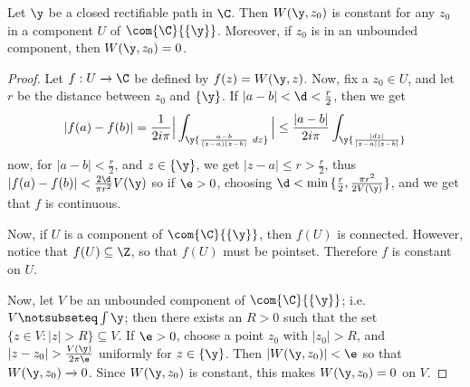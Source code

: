 \begin{theorem}\label{4.5.3}
    Let $\y$ be a closed rectifiable path in  $\C$. Then  $W(\y,z_0)$ is
    constant for any $z_0$ in a component $U$ of  $\com{\C}{\{\y\}}$. Moreover,
    if $z_0$ is in an unbounded component, then  $W(\y,z_0)=0$.
\end{theorem}
\begin{proof}
    Let $f:U \xrightarrow{} \C$ be defined by $f(z)=W(\y,z)$. Now, fix a $z_0
    \in U$, and let $r$ be the distance between  $z_0$ and $\{\y\}$. If
    $|a-b|<\d<\frac{r}{2}$, then we  get
    \begin{equation*}
        |f(a)-f(b)|=
        \frac{1}{2i\pi}\Big{|} \int_\y{\frac{a-b}{(z-a)(z-b)} \ dz} \Big{|} \leq
        \frac{|a-b|}{2i\pi}\int_\y{\frac{|dz|}{|z-a||z-b|}}
    \end{equation*}
    now, for $|a-b|<\frac{r}{2}$, and $z \in \{\y\}$, we get $|z-a| \leq
    r>\frac{r}{2}$, thus $|f(a)-f(b)|<\frac{2\d}{\pi{r^2}}V(\y)$ so if $\e>0$,
    choosing  $\d<\min{\{\frac{r}{2}, \frac{\pi{r^2}}{2V(\y)}\}}$, and we get
    that $f$ is continuous.

    Now, if $U$ is a component of $\com{\C}{\{\y\}}$, then $f(U)$ is connected.
    However, notice that $f(U) \subseteq \Z$, so that $f(U)$ must be pointset.
    Therefore $f$ is constant on $U$.

    Now, let $V$ be an unbounded component of $\com{\C}{\{\y\}}$; i.e. $V
    \notsubseteq \int{\y}$; then there exists an $R>0$ such that the set  $\{z
    \in V : |z|>R\} \subseteq V$. If $\e>0$, choose a point  $z_0$ with
    $|z_0|>R$, and $|z-z_0|>\frac{V(\y)}{2\pi\e}$ uniformly for $z \in
    \{\y\}$. Then $|W(\y,z_0)|<\e$ so that $W(\y,z_0) \xrightarrow{} 0$. Since
    $W(\y,z_0)$ is constant, this makes $W(\y,z_0)=0$ on $V$.
\end{proof}

